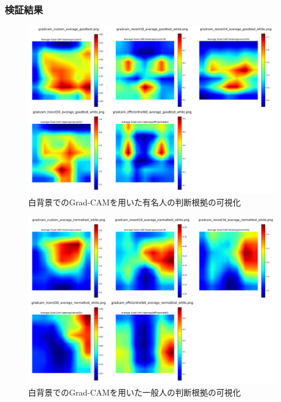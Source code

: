 \documentclass[a4paper,11pt,titlepage]{jsarticle}
\begin{document}
\subsubsection{検証結果}
\begin{figure}[H]
    \centering
    \includegraphics[width=1.1\textwidth]{white_combined_images_good.png}
    \caption{白背景でのGrad-CAMを用いた有名人の判断根拠の可視化}
    \label{fig:gradcam_good_white}
\end{figure}
\begin{figure}[H]
    \centering
    \includegraphics[width=1.1\textwidth]{white_combined_images_normal.png}
    \caption{白背景でのGrad-CAMを用いた一般人の判断根拠の可視化}
    \label{fig:gradcam_normal_white}
\end{figure}
\end{document}
